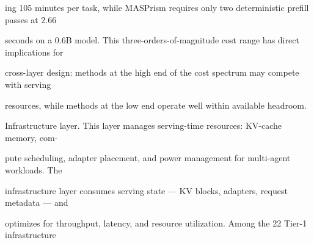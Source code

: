 \begin{flushleft}
\noindent ing 105 minutes per task, while MASPrism requires only two deterministic prefill passes at 2.66\par
\noindent seconds on a 0.6B model. This three-orders-of-magnitude cost range has direct implications for\par
\noindent cross-layer design: methods at the high end of the cost spectrum may compete with serving\par
\noindent resources, while methods at the low end operate well within available headroom.\par
\par\smallskip
\noindent Infrastructure layer. This layer manages serving-time resources: KV-cache memory, com-\par
\noindent pute scheduling, adapter placement, and power management for multi-agent workloads. The\par
\noindent infrastructure layer consumes serving state — KV blocks, adapters, request metadata — and\par
\noindent optimizes for throughput, latency, and resource utilization. Among the 22 Tier-1 infrastructure\par
\end{flushleft}
